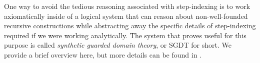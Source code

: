 

  

  



One way to avoid the tedious reasoning associated with step-indexing is to work
axiomatically inside of a logical system that can reason about non-well-founded recursive
constructions while abstracting away the specific details of step-indexing required
if we were working analytically.
The system that proves useful for this purpose is called \emph{synthetic guarded
domain theory}, or SGDT for short. We provide a brief overview here, but more
details can be found in \cite{birkedal-mogelberg-schwinghammer-stovring2011}.

